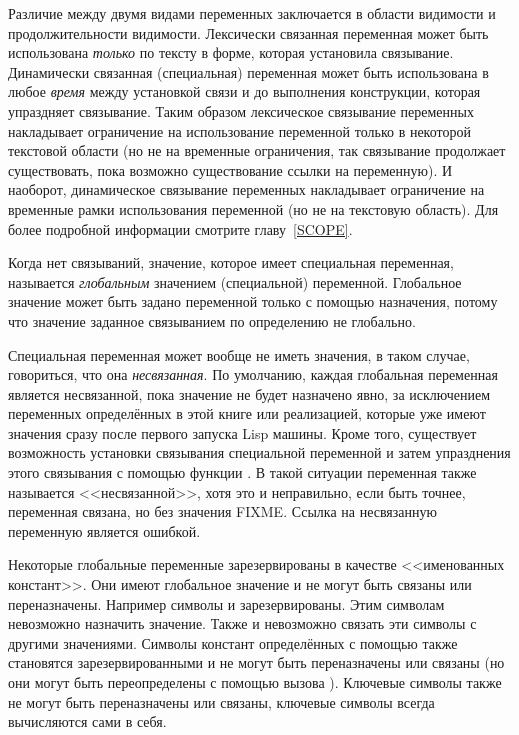 Различие между двумя видами переменных заключается в области видимости и
продолжительности видимости. Лексически связанная переменная может быть использована
\emph{только} по тексту в форме, которая установила связывание. Динамически
связанная (специальная) переменная может быть использована в любое
\emph{время} между установкой связи и до выполнения конструкции, которая
упраздняет связывание. Таким образом лексическое связывание переменных
накладывает ограничение на использование переменной только в некоторой текстовой
области (но не на временные ограничения, так связывание продолжает существовать,
пока возможно существование ссылки на переменную). И наоборот, динамическое
связывание переменных накладывает ограничение на временные рамки использования
переменной (но не на текстовую область).
Для более подробной информации смотрите главу~\ref{SCOPE}.

Когда нет связываний, значение, которое имеет специальная
переменная, называется \emph{глобальным} значением (специальной) переменной.
Глобальное значение может быть задано переменной только с помощью назначения,
потому что значение заданное связыванием по определению не глобально.

Специальная переменная может вообще не иметь значения, в таком случае,
говориться, что она \emph{несвязанная}. 
По умолчанию, каждая глобальная переменная является несвязанной, пока значение
не будет назначено явно, за исключением переменных определённых в этой книге или
реализацией, которые уже имеют значения сразу после первого запуска Lisp машины.
Кроме того, существует возможность установки связывания специальной переменной и
затем упразднения этого связывания с помощью функции . В такой
ситуации переменная также называется <<несвязанной>>, хотя это и неправильно,
если быть точнее, переменная связана, но без значения FIXME. Ссылка на несвязанную
переменную является ошибкой.

Некоторые глобальные переменные зарезервированы в качестве <<именованных
констант>>.
Они имеют глобальное значение и не могут быть связаны или переназначены.
Например символы {\true} и {\false} зарезервированы.
Этим символам невозможно назначить значение. Также и невозможно связать эти
символы с другими значениями. Символы констант определённых с помощью
 также становятся зарезервированными и не могут быть
переназначены или связаны (но они могут быть переопределены с помощью вызова
). Ключевые символы также не могут быть переназначены или
связаны, ключевые символы всегда вычисляются сами в себя.

